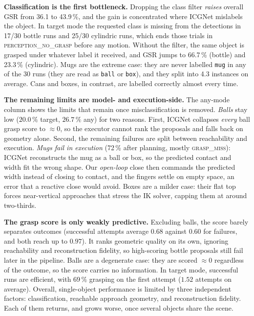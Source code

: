 \documentclass[10pt,twocolumn,letterpaper]{article}
\begin{document}
\noindent\textbf{Classification is the first bottleneck.}
Dropping the class filter \emph{raises} overall GSR from 36.1 to 43.9\,\%, and the gain is
concentrated where ICGNet mislabels the object. In target mode the requested class is missing from the
detections in 17/30 bottle runs and 25/30 cylindric runs, which ends those trials in
\textsc{perception\_no\_grasp} before any motion. Without the filter, the same object is grasped under
whatever label it received, and GSR jumps to 66.7\,\% (bottle) and 23.3\,\% (cylindric). Mugs are the
extreme case: they are never labelled \texttt{mug} in any of the 30 runs (they are read as
\texttt{ball} or \texttt{box}), and they split into 4.3 instances on average. Cans and boxes, in
contrast, are labelled correctly almost every time.

\noindent\textbf{The remaining limits are model- and execution-side.}
The any-mode column shows the limits that remain once misclassification is removed. \emph{Balls} stay
low ($20.0\,\%$ target, $26.7\,\%$ any) for two reasons. First, ICGNet collapses \emph{every} ball
grasp score to ${\approx}0$, so the executor cannot rank the proposals and falls back on geometry
alone. Second, the remaining failures are split between reachability and execution. \emph{Mugs fail in
execution} (72\,\% after planning, mostly \textsc{grasp\_miss}): ICGNet reconstructs the mug as a ball
or box, so the predicted contact and width fit the wrong shape. Our \emph{open-loop} close then
commands the predicted width instead of closing to contact, and the fingers settle on empty space, an
error that a reactive close would avoid. Boxes are a milder case: their flat top forces near-vertical
approaches that stress the IK solver, capping them at around two-thirds.

\noindent\textbf{The grasp score is only weakly predictive.}
Excluding balls, the score barely separates outcomes (successful attempts average $0.68$ against
$0.60$ for failures, and both reach up to $0.97$). It ranks geometric quality on its own, ignoring
reachability and reconstruction fidelity, so high-scoring bottle proposals still fail later in the
pipeline. Balls are a degenerate case: they are scored ${\approx}0$ regardless of the outcome, so the
score carries no information. In target mode, successful runs are efficient, with 69\,\% grasping on
the first attempt ($1.52$ attempts on average). Overall, single-object performance is limited by three
independent factors: classification, reachable approach geometry, and reconstruction fidelity. Each of
them returns, and grows worse, once several objects share the scene.
\end{document}
